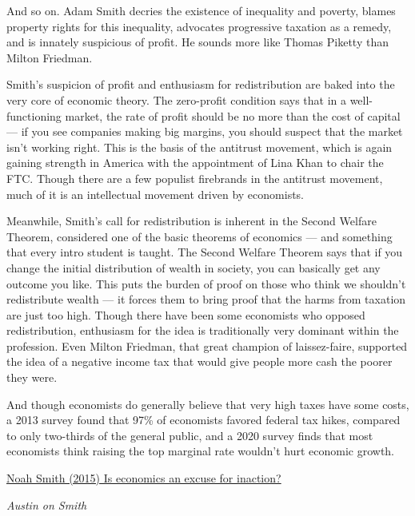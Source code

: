 \documentclass[
]{book}
\begin{document}
And so on. Adam Smith decries the existence of inequality and poverty, blames property rights for this inequality, advocates progressive taxation as a remedy, and is innately suspicious of profit. He sounds more like Thomas Piketty than Milton Friedman.

Smith's suspicion of profit and enthusiasm for redistribution are baked into the very core of economic theory. The zero-profit condition says that in a well-functioning market, the rate of profit should be no more than the cost of capital --- if you see companies making big margins, you should suspect that the market isn't working right. This is the basis of the antitrust movement, which is again gaining strength in America with the appointment of Lina Khan to chair the FTC. Though there are a few populist firebrands in the antitrust movement, much of it is an intellectual movement driven by economists.

Meanwhile, Smith's call for redistribution is inherent in the Second Welfare Theorem, considered one of the basic theorems of economics --- and something that every intro student is taught. The Second Welfare Theorem says that if you change the initial distribution of wealth in society, you can basically get any outcome you like. This puts the burden of proof on those who think we shouldn't redistribute wealth --- it forces them to bring proof that the harms from taxation are just too high. Though there have been some economists who opposed redistribution, enthusiasm for the idea is traditionally very dominant within the profession. Even Milton Friedman, that great champion of laissez-faire, supported the idea of a negative income tax that would give people more cash the poorer they were.

And though economists do generally believe that very high taxes have some costs, a 2013 survey found that 97\% of economists favored federal tax hikes, compared to only two-thirds of the general public, and a 2020 survey finds that most economists think raising the top marginal rate wouldn't hurt economic growth.

\href{https://noahpinion.substack.com/p/is-economics-an-excuse-for-inaction}{Noah Smith (2015) Is economics an excuse for inaction?}

\emph{Austin on Smith}
\end{document}
